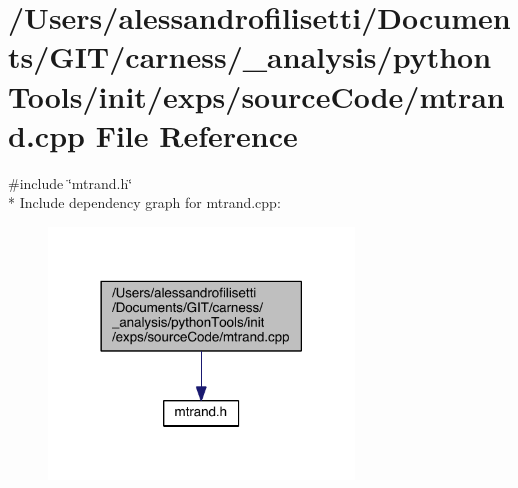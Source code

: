 \hypertarget{a00070}{\section{/\+Users/alessandrofilisetti/\+Documents/\+G\+I\+T/carness/\+\_\+analysis/python\+Tools/init/exps/source\+Code/mtrand.cpp File Reference}
\label{a00070}
}
{\ttfamily \#include \char`\"{}mtrand.\+h\char`\"{}}\\*
Include dependency graph for mtrand.\+cpp\+:\nopagebreak
\begin{figure}[H]
\begin{center}
\leavevmode
\includegraphics[width=230pt]{a00192}
\end{center}
\end{figure}
